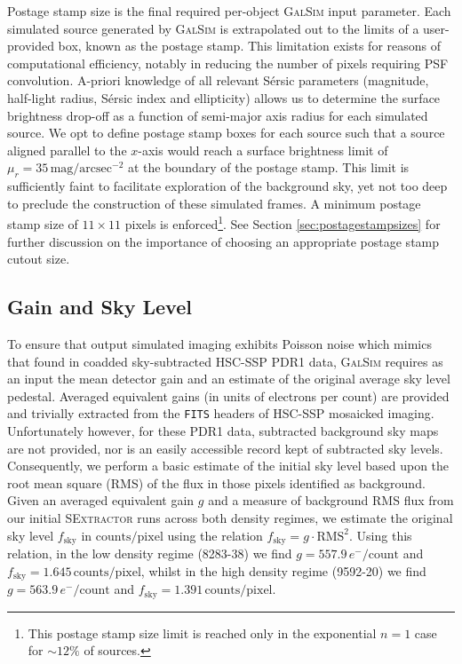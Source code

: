 \documentclass[fleqn,usenatbib,useAMS]{mnras}
\newcommand*{\about}{\mathord\sim}
\newcommand*{\Sersic}{S\'{e}rsic\xspace}
\newcommand*{\SExtractor}{\textsc{SExtractor}\xspace}
\newcommand*{\GalSim}{\textsc{GalSim}\xspace}
\begin{document}
Postage stamp size is the final required per-object \GalSim input parameter. Each simulated source generated by \GalSim is extrapolated out to the limits of a user-provided box, known as the postage stamp. This limitation exists for reasons of computational efficiency, notably in reducing the number of pixels requiring PSF convolution. A-priori knowledge of all relevant \Sersic parameters (magnitude, half-light radius, \Sersic index and ellipticity) allows us to determine the surface brightness drop-off as a function of semi-major axis radius for each simulated source. We opt to define postage stamp boxes for each source such that a source aligned parallel to the $x$-axis would reach a surface brightness limit of $\mu_r=35\,\mathrm{mag}/\mathrm{arcsec}^{-2}$ at the boundary of the postage stamp. This limit is sufficiently faint to facilitate exploration of the background sky, yet not too deep to preclude the construction of these simulated frames. A minimum postage stamp size of $11\times11$ pixels is enforced\footnote{This postage stamp size limit is reached only in the exponential $n=1$ case for $\about12\%$ of sources.}. See Section \ref{sec:postagestampsizes} for further discussion on the importance of choosing an appropriate postage stamp cutout size.

\subsection{Gain and Sky Level}
\label{sec:gainskylevel}

To ensure that output simulated imaging exhibits Poisson noise which mimics that found in coadded sky-subtracted HSC-SSP PDR1 data, \GalSim requires as an input the mean detector gain and an estimate of the original average sky level pedestal. Averaged equivalent gains (in units of electrons per count) are provided and trivially extracted from the \texttt{FITS} headers of HSC-SSP mosaicked imaging. Unfortunately however, for these PDR1 data, subtracted background sky maps are not provided, nor is an easily accessible record kept of subtracted sky levels. Consequently, we perform a basic estimate of the initial sky level based upon the root mean square (RMS) of the flux in those pixels identified as background. Given an averaged equivalent gain $g$ and a measure of background RMS flux from our initial \SExtractor runs across both density regimes, we estimate the original sky level $f_\mathrm{sky}$ in $\mathrm{counts}/\mathrm{pixel}$ using the relation $f_\mathrm{sky}=g\cdot\mathrm{RMS}^2$. Using this relation, in the low density regime (8283-38) we find $g=557.9\,e^{-}/\mathrm{count}$ and $f_\mathrm{sky}=1.645\,\mathrm{counts}/\mathrm{pixel}$, whilst in the high density regime (9592-20) we find $g=563.9\,e^{-}/\mathrm{count}$ and $f_\mathrm{sky}=1.391\,\mathrm{counts}/\mathrm{pixel}$.
\end{document}
